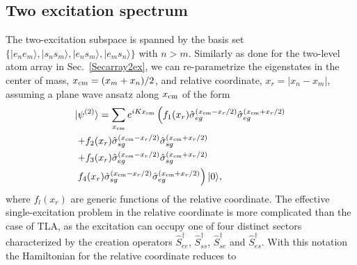 \documentclass[pra,twocolumn,showpacs,preprintnumbers,amsmath,amssymb]{revtex4-1}
\begin{document}
\subsection{Two excitation spectrum}
The two-excitation subspace is spanned by the basis set $\{|e_ne_m\rangle,|s_ns_m\rangle,|e_n s_m\rangle,|e_m s_n\rangle\}$ with $n>m$. Similarly as done for the two-level atom array in Sec.~\ref{Secarray2ex},  we can re-parametrize the  eigenstates in the center of mass, $x_{\rm cm}=(x_m+x_n)/2$, and  relative coordinate, $x_r=|x_n-x_m|$, assuming a plane wave ansatz along $x_{\rm cm}$ of the form
\begin{equation}\label{ans_ryd}
\begin{split}
 &|\psi^{(2)}\rangle =\sum_{x_{\rm cm}}e^{iKx_{\rm cm}}\left(f_1(x_r)\hat\sigma^{(x_{\rm cm}-x_r/2)}_{eg}\hat\sigma^{(x_{\rm cm}+x_r/2)}_{eg}\right.\\
& \left. +f_2(x_r)\hat\sigma^{(x_{\rm cm}-x_r/2)}_{sg}\hat\sigma^{(x_{\rm cm}+x_r/2)}_{sg}\right.\\
&\left.+f_3(x_r)\hat\sigma^{(x_{\rm cm}-x_r/2)}_{eg}\hat\sigma^{(x_{\rm cm}+x_r/2)}_{sg}\right.\\
& \left. f_4(x_r)\hat\sigma^{(x_{\rm cm}-x_r/2)}_{sg}\hat\sigma^{(x_{\rm cm}+x_r/2)}_{eg} \right)|0\rangle,
\end{split}
\end{equation}
where $f_l(x_r)$ are generic functions of the relative coordinate. 
The effective single-excitation problem in the relative coordinate is more complicated than the case of TLA, as the excitation can occupy one of four distinct sectors characterized by the creation operators $\hat S^{\dagger}_{ee}$, $\hat S^{\dagger}_{ss}$, $\hat S^{\dagger}_{se}$ and $\hat S^{\dagger}_{es}$. With this notation the Hamiltonian for the relative coordinate reduces to
\end{document}
